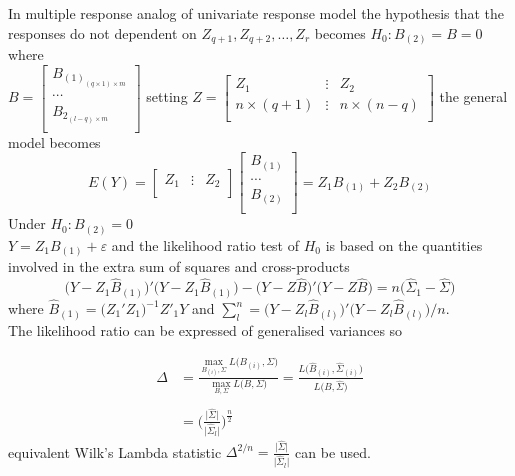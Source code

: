 \documentclass[11pt,a4paper]{article}
\theoremstyle{definition}
\begin{document}
In multiple response analog of univariate response model the hypothesis that the responses do not dependent on $Z_{q+1}, Z_{q+2}, \ldots, Z_r$ becomes $H_0: B_{(2)} =B = 0$ where\\ $B = \begin{bmatrix}
B_{(1)_{(q\times 1)\times m}}\\
\cdots\\
B_{2_{(l-q)\times m}}\\
\end{bmatrix}$ setting 
$Z=
\begin{bmatrix}
Z_1 & \vdots & Z_2\\
n\times (q+1) & \vdots & n\times (n-q)\\
\end{bmatrix}$ the general model  becomes
$$E(Y)=
\begin{bmatrix}
Z_1 & \vdots & Z_2\\
\end{bmatrix}
\begin{bmatrix}
B_{(1)}\\
\cdots\\
B_{(2)}\\
\end{bmatrix}
=Z_1B_{(1)} + Z_2B_{(2)}$$
Under $H_0: B_{(2)} = 0$ \\
$Y= Z_1B_{(1)} + \varepsilon$  and the likelihood ratio test of $H_0$ is based on the quantities involved in the extra sum of squares and cross-products
$$\big(Y-Z_1\widehat{B}_{(1)}\big)'\big(Y-Z_1\widehat{B}_{(1)}\big) - \big(Y-Z\widehat{B}\big)'\big(Y-Z\widehat{B}\big)=n\big(\widehat{\Sigma}_1-\widehat{\Sigma}\big)$$
where $\widehat{B}_{(1)}=\big(Z_1'Z_1\big)^{-1}Z'_1Y$ and $\sum\limits^n_l=\big(Y-Z_l\widehat{B}_{(l)}\big)'\big(Y-Z_l\widehat{B}_{(l)}\big)/n$.\\
The likelihood ratio can be expressed of generalised variances so




\begin{align*}
\Delta & = \frac{\max\limits_{B_{(i)},\Sigma}L\big(B_{(i)},\Sigma\big)}{\max\limits_{B,\Sigma}L\big(B,\Sigma\big)}
         = \frac{L\Big(\widehat{B}_{(i)},\widehat{\Sigma}_{(i)}\Big)}{L\Big(\widehat{B},\widehat{\Sigma}\Big)}\\\\
       & = \Bigg(\frac{\big|\widehat{\Sigma}\big|}{\big|\widehat{\Sigma}_l\big|}\Bigg)^{\frac{n}{2}}
\end{align*}
equivalent Wilk's Lambda statistic $\Delta^{2/n}=\frac{\big|\widehat{\Sigma}\big|}{\big|\widehat{\Sigma}_l\big|}$ can be used.\\\\
\end{document}
